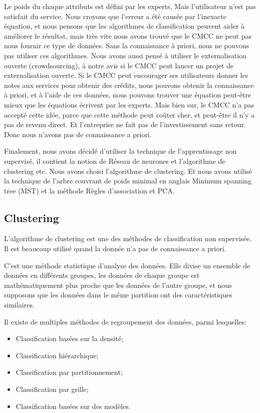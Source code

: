 Le poids du chaque attributs est défini par les experts, Mais l'utilisateur n'est pas satisfait du service. Nous croyons que l'erreur a été causée par l'inexacte équation, et nous pensons que les algorithmes de classification peuvent aider à améliorer le résultat, mais très vite nous avons trouvé que le CMCC ne peut pas nous fournir ce type de données. Sans la connaissance à priori, nous ne pouvons pas utiliser ces algorithmes. Nous avons aussi pensé à utiliser le externalisation ouverte (crowdsourcing), à notre avis si le CMCC peut lancer un projet de externalisation ouverte. Si le CMCC peut encourager ses utilisateurs donner les notes aux services pour obtenir des crédits, nous pouvons obtenir la connaissance à priori, et à l'aide de ces données, nous pouvons trouver une équation peut-être mieux que les équations écrivent par les experts. Mais bien sur, le CMCC n'a pas accepté cette idée, parce que cette méthode peut coûter cher, et peut-être il n'y a pas de revenu direct. Et l'entreprise ne fait pas de l'investissement sans retour. Donc nous n'avons pas de connaissance a priori.

Finalement, nous avons décidé d'utiliser la technique de l'apprentissage non supervisé, il contient la notion de Réseau de neurones et l'algorithme de clustering etc. Nous avons choisi l'algorithme de clustering. Et nous avons utilisé la technique de l'arbre couvrant de poids minimal en anglais Minimum spanning tree \textsf{(MST)} et la méthode \textsf{Règles d'association} et \textsf{PCA}.

\subsection{Clustering}
L'algorithme de clustering est une des méthodes de classification non supervisée. Il est beaucoup utilisé quand la donnée n'a pas de connaissance a priori.

C'est une méthode statistique d'analyse des données. Elle divise un ensemble de données en différents groupes, les données de chaque groupe est mathématiquement plus proche que les données de l'autre groupe,  et nous supposons que les données dans le même partition ont des caractéristiques similaires.

Il existe de multiples méthodes de regroupement des données, parmi lesquelles:
\begin{itemize}
\item Classification basées sur la densité;
\item Classification hiérarchique;
\item Classification par partitionnement;
\item Classification par grille;
\item Classification basées sur des modèles.
\end{itemize}
\vspace{1ex}

